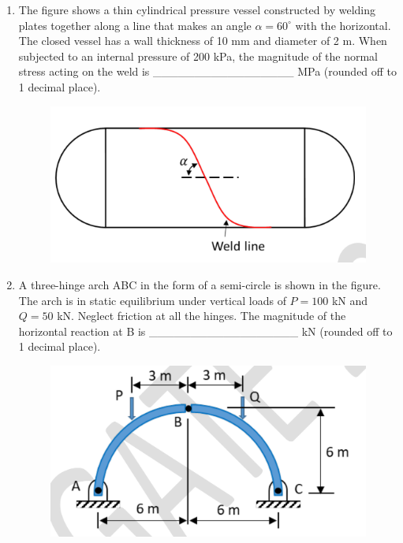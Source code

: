 \documentclass[journal,11pt,onecolumn]{IEEEtran}
\begin{document}
\begin{enumerate}[resume]
    \item The figure shows a thin cylindrical pressure vessel constructed by welding plates together along a line that makes an angle $\alpha = 60^\circ$ with the horizontal. The closed vessel has a wall thickness of 10 mm and diameter of 2 m. When subjected to an internal pressure of 200 kPa, the magnitude of the normal stress acting on the weld is \_\_\_\_\_\_\_\_\_\_\_\_\_\_\_\_\_ MPa (rounded off to 1 decimal place).

          \begin{figure}[H]
              \centering
              \includegraphics[scale=0.2]{q57}
              \caption{}
              \label{fig:q57}
          \end{figure}

    \item A three-hinge arch ABC in the form of a semi-circle is shown in the figure. The arch is in static equilibrium under vertical loads of $P = 100$ kN and $Q = 50$ kN. Neglect friction at all the hinges. The magnitude of the horizontal reaction at B is \_\_\_\_\_\_\_\_\_\_\_\_\_\_\_\_\_\_ kN (rounded off to 1 decimal place).

          \begin{figure}[H]
              \centering
              \includegraphics[scale=0.2]{q58}
              \caption{}
              \label{fig:q58}
          \end{figure}


\end{enumerate}
\end{document}
